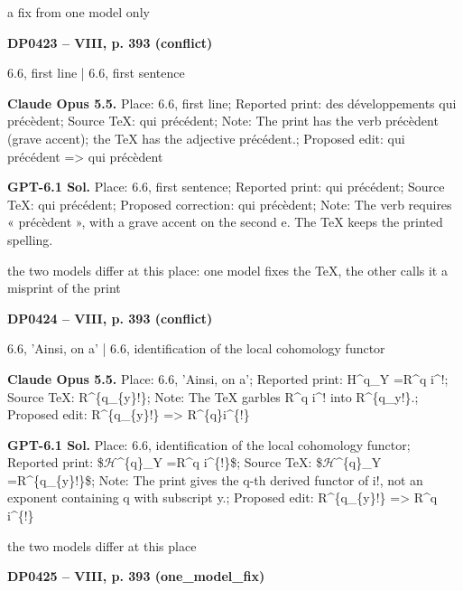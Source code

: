 a fix from one model only\par
\par\noindent\hypertarget{DP0423}{}\textbf{DP0423 -- VIII, p. 393 (conflict)}\par
6.6, first line | 6.6, first sentence\par
\textbf{Claude Opus 5.5.} Place: 6.6, first line; Reported print: des développements qui précèdent; Source TeX: qui précédent; Note: The print has the verb précèdent (grave accent); the TeX has the adjective précédent.; Proposed edit: qui précédent =\allowbreak > qui précèdent\par
\textbf{GPT-6.1 Sol.} Place: 6.6, first sentence; Reported print: qui précédent; Source TeX: qui précédent; Proposed correction: qui précèdent; Note: The verb requires « précèdent », with a grave accent on the second e. The TeX keeps the printed spelling.\par
the two models differ at this place: one model fixes the TeX, the other calls it a misprint of the print\par
\par\noindent\hypertarget{DP0424}{}\textbf{DP0424 -- VIII, p. 393 (conflict)}\par
6.6, 'Ainsi, on a' | 6.6, identification of the local cohomology functor\par
\textbf{Claude Opus 5.5.} Place: 6.6, 'Ainsi, on a'; Reported print: H\textasciicircum{}q\_Y =\allowbreak  R\textasciicircum{}q i\textasciicircum{}!; Source TeX: R\textasciicircum{}\{q\_\{y\}!\}; Note: The TeX garbles R\textasciicircum{}q i\textasciicircum{}! into R\textasciicircum{}\{q\_y!\}.; Proposed edit: R\textasciicircum{}\{q\_\{y\}!\} =\allowbreak > R\textasciicircum{}\{q\}i\textasciicircum{}\{!\}\par
\textbf{GPT-6.1 Sol.} Place: 6.6, identification of the local cohomology functor; Reported print: \$\ensuremath{\mathcal{H}}\textasciicircum{}\{q\}\_Y =\allowbreak  R\textasciicircum{}q i\textasciicircum{}\{!\}\$; Source TeX: \$\ensuremath{\mathcal{H}}\textasciicircum{}\{q\}\_Y  =\allowbreak  R\textasciicircum{}\{q\_\{y\}!\}\$; Note: The print gives the q-th derived functor of i!, not an exponent containing q with subscript y.; Proposed edit: R\textasciicircum{}\{q\_\{y\}!\} =\allowbreak > R\textasciicircum{}q i\textasciicircum{}\{!\}\par
the two models differ at this place\par
\par\noindent\hypertarget{DP0425}{}\textbf{DP0425 -- VIII, p. 393 (one\_model\_fix)}\par
